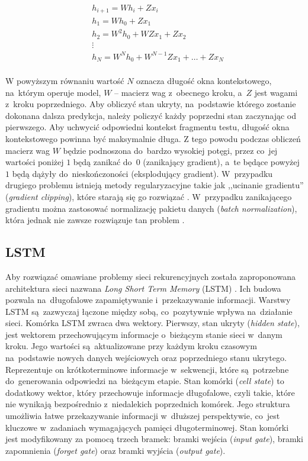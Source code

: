 \documentclass[data-science]{agh-wi} %
\begin{document}
\begin{equation}
    \begin{aligned}
         & h_{i+1}=Wh_i+Zx_i                      \\
         & h_1=Wh_0+Zx_1                          \\
         & h_2=W^2h_0+WZx_1+Zx_2                  \\
         & \vdots                                 \\
         & h_N = W^Nh_0+W^{N-1}Zx_1 +\dots + Zx_N \\
    \end{aligned}
    \label{equ:gradient}
\end{equation}

W powyższym równaniu wartość $N$ oznacza długość okna kontekstowego, na~którym operuje model, $W$ -- macierz wag z~obecnego kroku, a~$Z$ jest wagami z~kroku poprzedniego. Aby obliczyć stan ukryty, na~podstawie którego zostanie dokonana dalsza predykcja, należy policzyć każdy poprzedni stan zaczynając od pierwszego. Aby uchwycić odpowiedni kontekst fragmentu testu, długość okna kontekstowego powinna być maksymalnie długa. Z tego powodu podczas obliczeń macierz wag $W$ będzie podnoszona do~bardzo wysokiej potęgi, przez co~jej wartości poniżej $1$ będą zanikać do~$0$ (zanikający gradient), a~te będące powyżej $1$ będą dążyły do~nieskończoności (eksplodujący gradient). W~przypadku drugiego problemu istnieją metody regularyzacyjne takie jak ,,ucinanie gradientu'' (\textit{gradient clipping}), które starają się go rozwiązać \cite*{deeplearning_book}. W~przypadku zanikającego gradientu można zastosować normalizację pakietu danych (\textit{batch normalization}), która jednak nie zawsze rozwiązuje tan problem \cite*{batch_norm}.

\subsection{LSTM}
Aby rozwiązać omawiane problemy sieci rekurencyjnych została zaproponowana architektura sieci nazwana \textit{Long Short Term Memory} (LSTM) \cite{lstm_og}. Ich budowa pozwala na~długofalowe zapamiętywanie i~przekazywanie informacji. Warstwy LSTM są~zazwyczaj łączone między sobą, co~pozytywnie wpływa na~działanie sieci. Komórka LSTM zwraca dwa wektory. Pierwszy, stan ukryty (\textit{hidden state}), jest wektorem przechowującym informacje o~bieżącym stanie sieci w~danym kroku. Jego wartości są~aktualizowane przy każdym kroku czasowym na~podstawie nowych danych wejściowych oraz poprzedniego stanu ukrytego. Reprezentuje on krótkoterminowe informacje w~sekwencji, które są~potrzebne do~generowania odpowiedzi na~bieżącym etapie. Stan komórki (\textit{cell state}) to dodatkowy wektor, który przechowuje informacje długofalowe, czyli takie, które nie wynikają bezpośrednio z~niedalekich poprzednich komórek. Jego struktura umożliwia łatwe przekazywanie informacji w~dłuższej perspektywie, co~jest kluczowe w~zadaniach wymagających pamięci długoterminowej. Stan komórki jest modyfikowany za pomocą trzech bramek: bramki wejścia (\textit{input gate}), bramki zapomnienia (\textit{forget gate}) oraz bramki wyjścia (\textit{output gate}).
\end{document}
